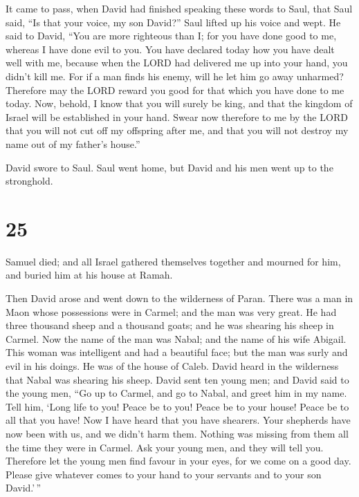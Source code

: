  It came to pass, when David had finished speaking these
words to Saul, that Saul said, ``Is that your voice, my son David?''
Saul lifted up his voice and wept.  He said to David, ``You
are more righteous than I; for you have done good to me, whereas I have
done evil to you.  You have declared today how you have
dealt well with me, because when the LORD had delivered me up into your
hand, you didn't kill me.  For if a man finds his enemy,
will he let him go away unharmed? Therefore may the LORD reward you good
for that which you have done to me today.  Now, behold, I
know that you will surely be king, and that the kingdom of Israel will
be established in your hand.  Swear now therefore to me by
the LORD that you will not cut off my offspring after me, and that you
will not destroy my name out of my father's house.''

 David swore to Saul. Saul went home, but David and his men
went up to the stronghold.

\hypertarget{section-24}{%
\section{25}\label{section-24}}

 Samuel died; and all Israel gathered themselves together
and mourned for him, and buried him at his house at Ramah.

Then David arose and went down to the wilderness of Paran. 
There was a man in Maon whose possessions were in Carmel; and the man
was very great. He had three thousand sheep and a thousand goats; and he
was shearing his sheep in Carmel.  Now the name of the man
was Nabal; and the name of his wife Abigail. This woman was intelligent
and had a beautiful face; but the man was surly and evil in his doings.
He was of the house of Caleb.  David heard in the wilderness
that Nabal was shearing his sheep.  David sent ten young
men; and David said to the young men, ``Go up to Carmel, and go to
Nabal, and greet him in my name.  Tell him, `Long life to
you! Peace be to you! Peace be to your house! Peace be to all that you
have!  Now I have heard that you have shearers. Your
shepherds have now been with us, and we didn't harm them. Nothing was
missing from them all the time they were in Carmel.  Ask
your young men, and they will tell you. Therefore let the young men find
favour in your eyes, for we come on a good day. Please give whatever
comes to your hand to your servants and to your son David.'\,''


